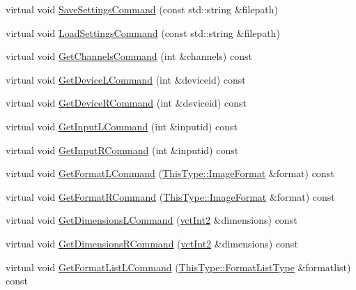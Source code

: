 \begin{DoxyCompactItemize}
\item 
virtual void \hyperlink{classsvl_filter_source_video_capture_abbacd31e3f5edfd5b2b2a50c7053bc99}{Save\-Settings\-Command} (const std\-::string \&filepath)
\item 
virtual void \hyperlink{classsvl_filter_source_video_capture_a3850149032cf1d35c30a3638b4481c76}{Load\-Settings\-Command} (const std\-::string \&filepath)
\item 
virtual void \hyperlink{classsvl_filter_source_video_capture_a1dd7a55838ea87f65aad6dd9ed2a7874}{Get\-Channels\-Command} (int \&channels) const 
\item 
virtual void \hyperlink{classsvl_filter_source_video_capture_a651807fb1391fd672e9bd97e598dd243}{Get\-Device\-L\-Command} (int \&deviceid) const 
\item 
virtual void \hyperlink{classsvl_filter_source_video_capture_ad6ec3e7df7121a67d17136126501d5ff}{Get\-Device\-R\-Command} (int \&deviceid) const 
\item 
virtual void \hyperlink{classsvl_filter_source_video_capture_a2fc6b6f712c78c0fdda8cfb62ac2cb35}{Get\-Input\-L\-Command} (int \&inputid) const 
\item 
virtual void \hyperlink{classsvl_filter_source_video_capture_a97e2fe09635eed40583aa6b1b4b51ab7}{Get\-Input\-R\-Command} (int \&inputid) const 
\item 
virtual void \hyperlink{classsvl_filter_source_video_capture_a3947836ef8d61f6201203c4db3614782}{Get\-Format\-L\-Command} (\hyperlink{classsvl_filter_source_video_capture_a0944cc8abe4240701683128c28fa5349}{This\-Type\-::\-Image\-Format} \&format) const 
\item 
virtual void \hyperlink{classsvl_filter_source_video_capture_af2ad11e3109c2162deef43ae9b66465f}{Get\-Format\-R\-Command} (\hyperlink{classsvl_filter_source_video_capture_a0944cc8abe4240701683128c28fa5349}{This\-Type\-::\-Image\-Format} \&format) const 
\item 
virtual void \hyperlink{classsvl_filter_source_video_capture_af1ce86b874a6fe5ef8356bf290dce420}{Get\-Dimensions\-L\-Command} (\hyperlink{vct_fixed_size_vector_types_8h_add8c88eb6a432b15f14b866b9c35325f}{vct\-Int2} \&dimensions) const 
\item 
virtual void \hyperlink{classsvl_filter_source_video_capture_a69e13d8177c9db036b867a53f6196e16}{Get\-Dimensions\-R\-Command} (\hyperlink{vct_fixed_size_vector_types_8h_add8c88eb6a432b15f14b866b9c35325f}{vct\-Int2} \&dimensions) const 
\item 
virtual void \hyperlink{classsvl_filter_source_video_capture_a8f6d51e949b294c7d30d17fe98755abd}{Get\-Format\-List\-L\-Command} (\hyperlink{classsvl_filter_source_video_capture_af6d31bdf8807755322cd7e5ef1f0d8d9}{This\-Type\-::\-Format\-List\-Type} \&formatlist) const 

\end{DoxyCompactItemize}
